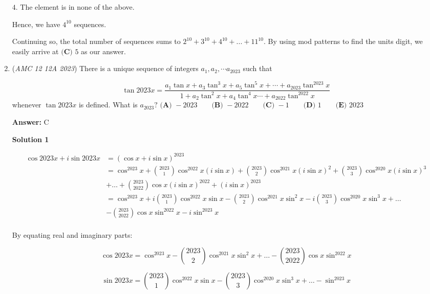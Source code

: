 \begin{enumerate}
 $4$. The element is in none of the above.

 Hence, we have $4^{10}$ sequences.

 
Continuing so, the total number of sequences sums to $2^{10} + 3^{10} + 4^{10} + ... + 11^{10}$. By using mod patterns to find the units digit, we easily arrive at $\boxed{\textbf{(C) } 5}$ as our answer.

 


 


	\item (\textit{AMC 12 12A 2023}) There is a unique sequence of integers $a_1, a_2, \cdots a_{2023}$ such that

 \[\tan2023x = \frac{a_1 \tan x + a_3 \tan^3 x + a_5 \tan^5 x + \cdots + a_{2023} \tan^{2023} x}{1 + a_2 \tan^2 x + a_4 \tan^4 x \cdots + a_{2022} \tan^{2022} x}\]whenever $\tan 2023x$ is defined. What is $a_{2023}?$
$\textbf{(A) } -2023 \qquad\textbf{(B) } -2022 \qquad\textbf{(C) } -1 \qquad\textbf{(D) } 1 \qquad\textbf{(E) } 2023$

 \textbf{Answer: }C



\textbf{Solution 1}


 \begin{align*} \cos 2023 x + i \sin 2023 x &= (\cos x + i \sin x)^{2023}\\ &= \cos^{2023} x + \binom{2023}{1} \cos^{2022} x (i\sin x) + \binom{2023}{2} \cos^{2021} x (i \sin x)^{2} +\binom{2023}{3} \cos^{2020} x (i \sin x)^{3}\\ &+ \dots + \binom{2023}{2022} \cos x (i \sin x)^{2022} + (i \sin x)^{2023}\\ &= \cos^{2023} x + i \binom{2023}{1} \cos^{2022} x \sin x - \binom{2023}{2} \cos^{2021} x \sin^{2} x - i\binom{2023}{3} \cos^{2020} x \sin^{3} x + \dots\\ &- \binom{2023}{2022} \cos x \sin^{2022} x - i \sin^{2023} x\\ \end{align*}


 By equating real and imaginary parts:

 
 \[\cos 2023 x = \cos^{2023} x - \binom{2023}{2} \cos^{2021} x \sin^{2} x + \dots - \binom{2023}{2022} \cos x \sin^{2022} x\]

 \[\sin 2023 x = \binom{2023}{1} \cos^{2022} x \sin x - \binom{2023}{3} \cos^{2020} x \sin^{3} x + \dots - \sin^{2023} x\]


\end{enumerate}
